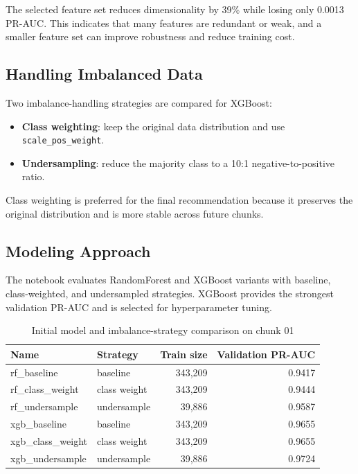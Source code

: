 \documentclass[12pt,a4paper,twoside]{article}
\begin{document}
The selected feature set reduces dimensionality by 39\% while losing only 0.0013 PR-AUC. This indicates that many features are redundant or weak, and a smaller feature set can improve robustness and reduce training cost.

\subsection{Handling Imbalanced Data}

Two imbalance-handling strategies are compared for XGBoost:
\begin{itemize}
    \item \textbf{Class weighting}: keep the original data distribution and use \texttt{scale\_pos\_weight}.
    \item \textbf{Undersampling}: reduce the majority class to a 10:1 negative-to-positive ratio.
\end{itemize}

Class weighting is preferred for the final recommendation because it preserves the original distribution and is more stable across future chunks.

\subsection{Modeling Approach}

The notebook evaluates RandomForest and XGBoost variants with baseline, class-weighted, and undersampled strategies. XGBoost provides the strongest validation PR-AUC and is selected for hyperparameter tuning.

\begin{table}[H]
\centering
\caption{Initial model and imbalance-strategy comparison on chunk 01}
\begin{tabular}{llrr}
\toprule
\textbf{Name} & \textbf{Strategy} & \textbf{Train size} & \textbf{Validation PR-AUC} \\
\midrule
rf\_baseline & baseline & 343,209 & 0.9417 \\
rf\_class\_weight & class weight & 343,209 & 0.9444 \\
rf\_undersample & undersample & 39,886 & 0.9587 \\
xgb\_baseline & baseline & 343,209 & 0.9655 \\
xgb\_class\_weight & class weight & 343,209 & 0.9655 \\
xgb\_undersample & undersample & 39,886 & 0.9724 \\
\bottomrule
\end{tabular}
\end{table}
\end{document}
